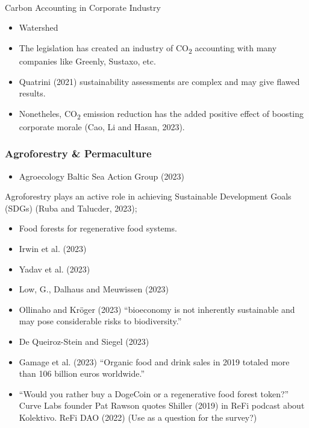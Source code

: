 \documentclass[
  letterpaper,
  DIV=11,
  numbers=noendperiod]{scrartcl}
\makeatletter
\let\oldparagraph\paragraph
\renewcommand{\paragraph}{
    \@ifstar
      \xxxParagraphStar
      \xxxParagraphNoStar
  }
\newcommand{\xxxParagraphStar}[1]{\oldparagraph*{#1}\mbox{}}
\newcommand{\xxxParagraphNoStar}[1]{\oldparagraph{#1}\mbox{}}
\providecommand{\tightlist}{%
  \setlength{\itemsep}{0pt}\setlength{\parskip}{0pt}}\usepackage{longtable,booktabs,array}
\makeatother
\begin{document}
\paragraph{Carbon Accounting in Corporate
Industry}\label{carbon-accounting-in-corporate-industry}

\begin{itemize}
\item
  Watershed
\item
  The legislation has created an industry of CO\textsubscript{2}
  accounting with many companies like Greenly, Sustaxo, etc.
\item
  Quatrini (2021) sustainability assessments are complex and may give
  flawed results.
\item
  Nonetheles, CO\textsubscript{2} emission reduction has the added
  positive effect of boosting corporate morale (Cao, Li and Hasan,
  2023).
\end{itemize}

\subsubsection{Agroforestry \&
Permaculture}\label{agroforestry-permaculture}

\begin{itemize}
\tightlist
\item
  Agroecology Baltic Sea Action Group (2023)
\end{itemize}

Agroforestry plays an active role in achieving Sustainable Development
Goals (SDGs) (Ruba and Talucder, 2023);

\begin{itemize}
\item
  Food forests for regenerative food systems.
\item
  Irwin et al. (2023)
\item
  Yadav et al. (2023)
\item
  Low, G., Dalhaus and Meuwissen (2023)
\item
  Ollinaho and Kröger (2023) ``bioeconomy is not inherently sustainable
  and may pose considerable risks to biodiversity.''
\item
  De Queiroz-Stein and Siegel (2023)
\item
  Gamage et al. (2023) ``Organic food and drink sales in 2019 totaled
  more than 106 billion euros worldwide.''
\item
  ``Would you rather buy a DogeCoin or a regenerative food forest
  token?'' Curve Labs founder Pat Rawson quotes Shiller (2019) in ReFi
  podcast about Kolektivo. ReFi DAO (2022) (Use as a question for the
  survey?)
\end{itemize}
\end{document}
